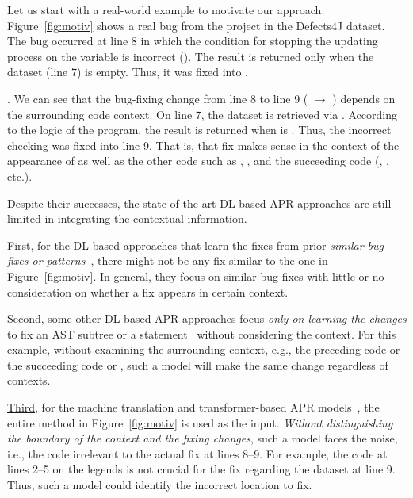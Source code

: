 Let us start with a real-world example to motivate our approach.
Figure~\ref{fig:motiv} shows a real bug from the project 
in the Defects4J dataset. The bug occurred at line 8 in which the
condition for stopping the updating process on the 
variable is incorrect (). The result is
returned only when the dataset (line 7) is empty. Thus, it was fixed
into .

. We
can see that the bug-fixing change from line 8 to line 9 ( $\rightarrow$ )
depends on the surrounding code context. On line 7, the dataset is
retrieved via . According to the logic of the
program, the result is returned when  is .
Thus, the incorrect checking was fixed into line 9. That is, that fix
makes sense in the context of the appearance of  as
well as the other code such as ,
, and the succeeding code
(, , etc.).

Despite their successes, the state-of-the-art DL-based APR approaches
are still limited in integrating the contextual information.

\underline{First}, for the DL-based approaches that learn the
fixes from prior {\em similar bug fixes or
  patterns}~\cite{gupta2017deepfix,white2019sorting,white2016deep},
there might not be any fix similar to the one in
Figure~\ref{fig:motiv}. In general, they focus on similar bug fixes
with little or no consideration on whether a fix appears in certain
context.

\underline{Second}, some other DL-based APR approaches focus {\em only
  on learning the changes} to fix an AST subtree or a
statement~\cite{chakrabortycodit,see2017get} without considering the
context. For this example, without examining the surrounding context,
e.g., the preceding code  or the succeeding code
 or , such a model will
make the same change regardless of contexts.


\underline{Third}, for the machine translation and transformer-based
APR
models~\cite{hata2018learning,tufano2019learning,tufano2018empirical},
the entire method in Figure~\ref{fig:motiv} is used as the input. {\em
  Without distinguishing the boundary of the context and the fixing
  changes}, such a model faces the noise, i.e., the code irrelevant to
the actual fix at lines 8--9. For example, the code at lines 2--5 on
the legends is not crucial for the fix regarding the dataset at line
9. Thus, such a model could identify the incorrect location to fix.

